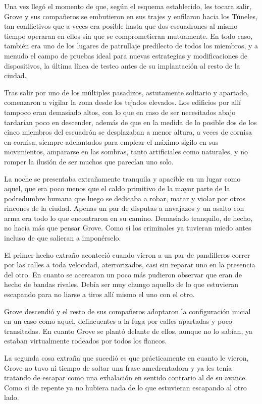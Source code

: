 Una vez llegó el momento de que, según el esquema establecido, les tocara salir, Grove y sus compañeros se embutieron en sus trajes y enfilaron hacia los Túneles, tan conflictivos que a veces era posible hasta que dos escuadrones al mismo tiempo operaran en ellos sin que se comprometieran mutuamente. En todo caso, también era uno de los lugares de patrullaje predilecto de todos los miembros, y a menudo el campo de pruebas ideal para nuevas estrategias y modificaciones de dispositivos, la última línea de testeo antes de su implantación al resto de la ciudad.

Tras salir por uno de los múltiples pasadizos, astutamente solitario y apartado, comenzaron a vigilar la zona desde los tejados elevados. Los edificios por allí tampoco eran demasiado altos, con lo que en caso de ser necesitados abajo tardarían poco en descender, además de que en la medida de lo posible dos de los cinco miembros del escuadrón se desplazaban a menor altura, a veces de cornisa en cornisa, siempre adelantados para emplear el máximo sigilo en sus movimientos, ampararse en las sombras, tanto artificiales como naturales, y no romper la ilusión de ser muchos que parecían uno solo.

La noche se presentaba extrañamente tranquila y apacible en un lugar como aquel, que era poco menos que el caldo primitivo de la mayor parte de la podredumbre humana que luego se dedicaba a robar, matar y violar por otros rincones de la ciudad. Apenas un par de disputas a navajazos y un asalto con arma era todo lo que encontraron en su camino. Demasiado tranquilo, de hecho, no hacía más que pensar Grove. Como si los criminales ya tuvieran miedo antes incluso de que salieran a imponérselo.

El primer hecho extraño aconteció cuando vieron a un par de pandilleros correr por las calles a toda velocidad, aterrorizados, casi sin reparar uno en la presencia del otro. En cuanto se acercaron un poco más pudieron observar que eran de hecho de bandas rivales. Debía ser muy chungo aquello de lo que estuvieran escapando para no liarse a tiros allí mismo el uno con el otro.

Grove descendió y el resto de sus compañeros adoptaron la configuración inicial en un caso como aquel, delincuentes a la fuga por calles apartadas y poco transitadas. En cuanto Grove se plantó delante de ellos, aunque no lo sabían, ya estaban virtualmente rodeados por todos los flancos.

La segunda cosa extraña que sucedió es que prácticamente en cuanto le vieron, Grove no tuvo ni tiempo de soltar una frase amedrentadora y ya les tenía tratando de escapar como una exhalación en sentido contrario al de su avance. Como si de repente ya no hubiera nada de lo que estuvieran escapando al otro lado.

